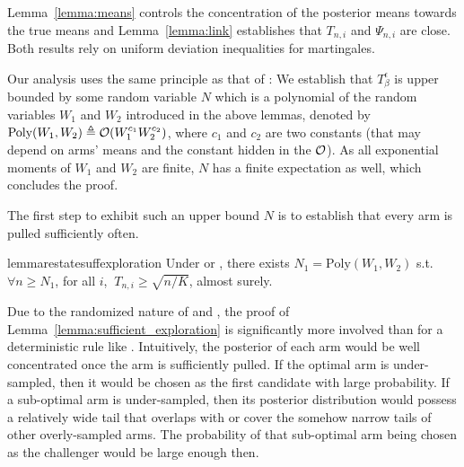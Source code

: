 Lemma~\ref{lemma:means} controls the concentration of the posterior means towards the true means and Lemma~\ref{lemma:link} establishes that $T_{n,i}$ and $\Psi_{n,i}$ are close. Both results rely on uniform deviation inequalities for martingales.


Our analysis uses the same principle as that of \TTEI: We establish that $T_\beta^\epsilon$ is upper bounded by some random variable $N$ which is a polynomial of the random variables $W_1$ and $W_2$ introduced in the above lemmas, denoted by $\text{Poly}(W_1,W_2) \triangleq \mathcal{O}(W_1^{c_1}W_2^{c_2})$, where $c_1$ and $c_2$ are two constants (that may depend on arms' means and the constant hidden in the $\mathcal{O}$). As all exponential moments of $W_1$ and $W_2$ are finite, $N$ has a finite expectation as well, which concludes the proof.

The first step to exhibit such an upper bound $N$ is to establish that every arm is pulled sufficiently often. 

\begin{restatable}{lemma}{restatesuffexploration}\label{lemma:sufficient_exploration}
Under \TTTS or \TCC, there exists $N_1 = \text{Poly}(W_1,W_2)$ s.t. $\forall n \geq N_1$, for all $i$, $\ T_{n,i} \geq \sqrt{{n}/{K}}$, almost surely.
\end{restatable}

Due to the randomized nature of \TTTS and \TCC, the proof of Lemma~\ref{lemma:sufficient_exploration} is significantly more involved than for a deterministic rule like \TTEI. Intuitively, the posterior of each arm would be well concentrated once the arm is sufficiently pulled. If the optimal arm is under-sampled, then it would be chosen as the first candidate with large probability. If a sub-optimal arm is under-sampled, then its posterior distribution would possess a relatively wide tail that overlaps with or cover the somehow narrow tails of other overly-sampled arms. The probability of that sub-optimal arm being chosen as the challenger would be large enough then.


